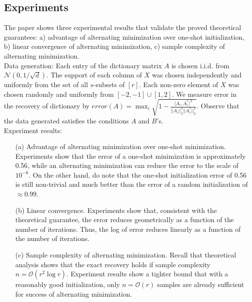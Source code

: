 \subsection{Experiments}
The paper shows three experimental results that validate the proved theoretical guarantees: a) advantage of alternating minimization over one-shot initialization, b) linear convergence of alternating minimization, c) sample complexity of alternating minimization. \\

Data generation: Each entry of the dictionary matrix $A$ is chosen i.i.d. from $\mathcal{N}(0, 1/\sqrt{d})$. The support of each column of $X$ was chosen independently and uniformly from the set of all $s$-subsets of $[r]$. Each non-zero element of $X$ was chosen randomly and uniformly from $[-2, -1] \cup [1, 2]$. We measure error in the recovery of dictionary by $error(A) = \max_i \sqrt{1-\frac{\langle A_i, A_i^* \rangle ^2}{||A_i||_2^2 ||A_i^*||_2^2}}$. Observe that the data generated satisfies the conditions $A$ and $B$'s.\\

Experiment results:
\begin{enumerate}
\item[(a)] Advantage of alternating minimization over one-shot minimization. Experiments show that the error of a one-shot minimization is approximately 0.56, while an alternating minimization can reduce the error to the scale of $10^{-6}$. On the other hand, do note that the one-shot initialization error of 0.56 is still non-trivial and much better than the error of a random initialization of $\approx 0.99$.

\item[(b)] Linear convergence. Experiments show that, consistent with the theoretical guarantee, the error reduces geometrically as a function of the number of iterations. Thus, the log of error reduces linearly as a function of the number of iterations. 

\item[(c)] Sample complexity of alternating minimization. Recall that theoretical analysis shows that the exact recovery holds if sample complexity $n = \mathcal{O}(r^2\log r)$. Experiment results show a tighter bound that with a reasonably good initialization, only $n = \mathcal{O}(r)$ samples are already sufficient for success of alternating minimization. 

\end{enumerate}

